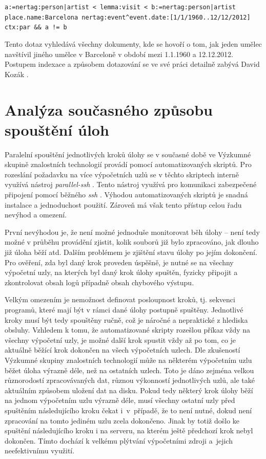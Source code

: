 \begin{flushleft}
\texttt{a:=nertag:person|artist < lemma:visit < b:=nertag:person|artist \newline place.name:Barcelona nertag:event\textasciicircum event.date:[1/1/1960..12/12/2012] \newline ctx:par \&\& a != b}
\end{flushleft}

Tento dotaz vyhledává všechny dokumenty, kde se hovoří o tom, jak jeden umělec navštívil jiného umělce v Barceloně v období mezi 1.1.1960 a 12.12.2012.  Postupem indexace a způsobem dotazování se ve své práci detailně zabývá David Kozák \cite{Indexace}.

\section{Analýza současného způsobu spouštění úloh}
\label{section:act_way_of_running_tasks}

Paralelní spouštění jednotlivých kroků úlohy se v současné době ve Výzkumné skupině znalostních technologií provádí pomocí automatizovaných skriptů. Pro rozeslání požadavku na více výpočetních uzlů se v těchto skriptech interně využívá nástroj \textit{parallel-ssh} \cite{PsshManPage}. Tento nástroj využívá pro komunikaci zabezpečené připojení pomocí běžného \textit{ssh} \cite{SshManPage}. Výhodou automatizovaných skriptů je snadná instalace a jednoduchost použití. Zároveň má však tento přístup celou řadu nevýhod a omezení. 

První nevýhodou je, že není možné jednoduše monitorovat běh úlohy -- není tedy možné v průběhu provádění zjistit, kolik souborů již bylo zpracováno, jak dlouho již úloha běží atd. Dalším problémem je zjištění stavu úlohy po jejím dokončení. Pro ověření, zda byl daný krok proveden úspěšně, je nutné se na všechny výpočetní uzly, na kterých byl daný krok úlohy spuštěn, fyzicky připojit a zkontrolovat obsah logů případně obsah chybového výstupu.

Velkým omezením je nemožnost definovat posloupnost kroků, tj. sekvenci programů, které mají být v rámci dané úlohy postupně spuštěny. Jednotlivé kroky musí být tedy spouštěny ručně, což je náročné a nepraktické z hlediska obsluhy. Vzhledem k tomu, že automatizované skripty rozešlou příkaz vždy na všechny výpočetní uzly, je možné další krok spustit vždy až po tom, co je aktuálně běžící krok dokončen na všech výpočetních uzlech. Dle zkušeností Výzkumné skupiny znalostních technologií může na některém výpočetním uzlu běžet úloha výrazně déle, než na ostatních uzlech. Toto je dáno zejména velkou různorodostí zpracovávaných dat, různou výkonností jednotlivých uzlů, ale také aktuálním způsobem uložení dat na disku. Pokud tedy některý krok úlohy běží na jednom výpočetním uzlu výrazně déle, musí všechny ostatní uzly před spuštěním následujícího kroku čekat i~v~případě, že to není nutné, dokud není zpracování na tomto jediném uzlu zcela dokončeno. Jinak by totiž došlo ke spuštění následujícího kroku i na serveru, na kterém ještě předchozí krok nebyl dokončen. Tímto dochází k velkému plýtvání výpočetními zdroji a~jejich neefektivnímu využití.

